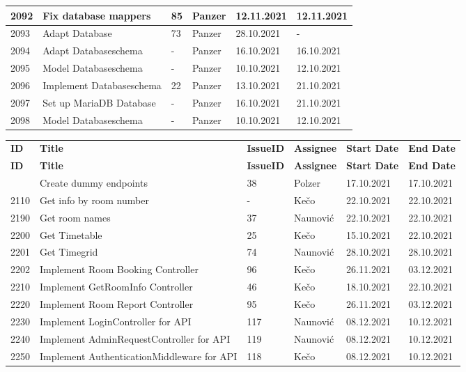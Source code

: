 \begin{longtable}{|p{}|p{}|p{}|p{}|p{}|p{}|}
    2092 & Fix database mappers & 85 & Panzer & 12.11.2021 & 12.11.2021 \\ \hline
    2093 & Adapt Database & 73 & Panzer & 28.10.2021 & - \\ \hline
    2094 & Adapt Databaseschema & - & Panzer & 16.10.2021 & 16.10.2021 \\ \hline
    2095 & Model Databaseschema & - & Panzer & 10.10.2021 & 12.10.2021 \\ \hline
    2096 & Implement Databaseschema & 22 & Panzer & 13.10.2021 & 21.10.2021 \\ \hline
    2097 & Set up MariaDB Database & - & Panzer & 16.10.2021 & 21.10.2021 \\ \hline
    2098 & Model Databaseschema & - & Panzer & 10.10.2021 & 12.10.2021 \\ \hline
\end{longtable}


\begin{longtable}{|p{}|p{}|p{}|p{}|p{}|p{}|} \hline
    \textbf{ID} & \textbf{Title} & \textbf{Issue\-ID} & \textbf{Assignee} & \textbf{Start Date} & \textbf{End\- Date} \\ \hhline{|=|=|=|=|=|=|}
    \endfirsthead
    \hline
    \textbf{ID} & \textbf{Title} & \textbf{Issue\-ID} & \textbf{Assignee} & \textbf{Start Date} & \textbf{End\- Date} \\ \hhline{|=|=|=|=|=|=|}
    \endhead
    2100 & Create dummy endpoints & 38 & Polzer & 17.10.2021 & 17.10.2021 \\ \hline
    2110 & Get info by room number & - & Kečo & 22.10.2021 & 22.10.2021 \\ \hline
    2190 & Get room names & 37 & Naunović & 22.10.2021 & 22.10.2021 \\ \hline
    2200 & Get Timetable & 25 & Kečo & 15.10.2021 & 22.10.2021 \\ \hline
    2201 & Get Timegrid & 74 & Naunović & 28.10.2021 & 28.10.2021 \\ \hline
    2202 & Implement Room Booking Controller & 96 & Kečo & 26.11.2021 & 03.12.2021 \\ \hline
    2210 & Implement GetRoomInfo Controller & 46 & Kečo & 18.10.2021 & 22.10.2021 \\ \hline
    2220 & Implement Room Report Controller & 95 & Kečo & 26.11.2021 & 03.12.2021 \\ \hline
    2230 & Implement LoginController for API & 117 & Naunović & 08.12.2021 & 10.12.2021 \\ \hline
    2240 & Implement AdminRequestController for API & 119 & Naunović & 08.12.2021 & 10.12.2021 \\ \hline
    2250 & Implement AuthenticationMiddleware for API & 118 & Kečo & 08.12.2021 & 10.12.2021 \\ \hline
\end{longtable}


